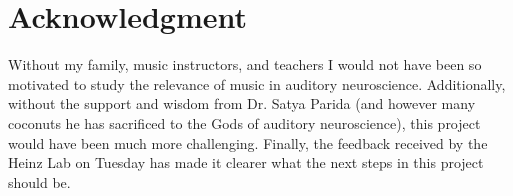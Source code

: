 \documentclass[conference]{IEEEtran}
\begin{document}
%


\section*{Acknowledgment}

Without my family, music instructors, and teachers I would not have been so motivated to study the relevance of music in auditory neuroscience. Additionally, without the support and wisdom from Dr. Satya Parida (and however many coconuts he has sacrificed to the Gods of auditory neuroscience), this project would have been much more challenging. Finally, the feedback received by the Heinz Lab on Tuesday has made it clearer what the next steps in this project should be.




% 

{}
\end{document}
